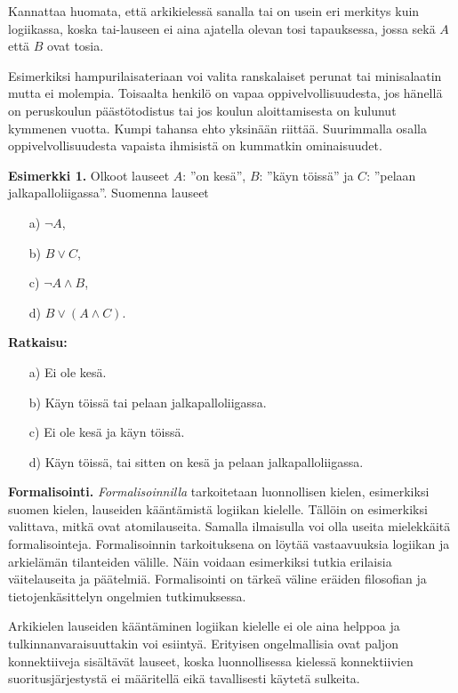 \bigskip

Kannattaa huomata, että arkikielessä sanalla tai on usein eri merkitys kuin logiikassa, koska tai-lauseen ei aina ajatella olevan tosi tapauksessa, jossa sekä $A$ että $B$ ovat tosia.

Esimerkiksi hampurilaisateriaan voi valita ranskalaiset perunat tai minisalaatin mutta ei molempia. Toisaalta henkilö on vapaa oppivelvollisuudesta, jos hänellä on peruskoulun päästötodistus tai jos koulun aloittamisesta on kulunut kymmenen vuotta. Kumpi tahansa ehto yksinään riittää. Suurimmalla osalla oppivelvollisuudesta vapaista ihmisistä on kummatkin ominaisuudet.

{\bf Esimerkki 1.}
Olkoot lauseet $A$: ''on kesä'', $B$: ''käyn töissä'' ja $C$: ''pelaan jalkapalloliigassa''. Suomenna lauseet
\begin{itemize}
\item[a)] $\lnot A$, 
\item[b)] $B\lor C$,
\item[c)] $\lnot A\land B$,
\item[d)] $B\lor (A\land C)$.
\end{itemize}

{\bf Ratkaisu:}
\begin{itemize}
\item[a)] Ei ole kesä.
\item[b)] Käyn töissä tai pelaan jalkapalloliigassa.
\item[c)] Ei ole kesä ja käyn töissä.
\item[d)] Käyn töissä, tai sitten on kesä ja pelaan jalkapalloliigassa.
\end{itemize}


{\bf Formalisointi.}
{\em Formalisoinnilla} tarkoitetaan luonnollisen kielen, esimerkiksi suomen kielen, lauseiden kääntämistä logiikan kielelle. Tällöin on esimerkiksi valittava, mitkä ovat atomilauseita. Samalla ilmaisulla voi olla useita mielekkäitä formalisointeja. Formalisoinnin tarkoituksena on löytää vastaavuuksia logiikan ja arkielämän tilanteiden välille. Näin voidaan esimerkiksi tutkia erilaisia väitelauseita ja päätelmiä. Formalisointi on tärkeä väline eräiden filosofian ja tietojenkäsittelyn ongelmien tutkimuksessa.

Arkikielen lauseiden kääntäminen logiikan kielelle ei ole aina helppoa ja tulkinnanvaraisuuttakin voi esiintyä. Erityisen ongelmallisia ovat paljon konnektiiveja sisältävät lauseet, koska luonnollisessa kielessä konnektiivien suoritusjärjestystä ei määritellä eikä tavallisesti käytetä sulkeita.

